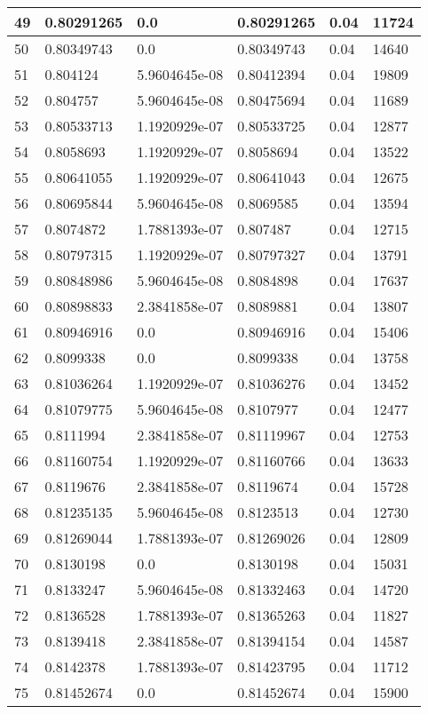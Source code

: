 \begin{longtable}{|l|l|l|l|l|l|}
49 & 0.80291265 & 0.0 & 0.80291265 & 0.04 & 11724 \\ \hline 
50 & 0.80349743 & 0.0 & 0.80349743 & 0.04 & 14640 \\ \hline 
51 & 0.804124 & 5.9604645e-08 & 0.80412394 & 0.04 & 19809 \\ \hline 
52 & 0.804757 & 5.9604645e-08 & 0.80475694 & 0.04 & 11689 \\ \hline 
53 & 0.80533713 & 1.1920929e-07 & 0.80533725 & 0.04 & 12877 \\ \hline 
54 & 0.8058693 & 1.1920929e-07 & 0.8058694 & 0.04 & 13522 \\ \hline 
55 & 0.80641055 & 1.1920929e-07 & 0.80641043 & 0.04 & 12675 \\ \hline 
56 & 0.80695844 & 5.9604645e-08 & 0.8069585 & 0.04 & 13594 \\ \hline 
57 & 0.8074872 & 1.7881393e-07 & 0.807487 & 0.04 & 12715 \\ \hline 
58 & 0.80797315 & 1.1920929e-07 & 0.80797327 & 0.04 & 13791 \\ \hline 
59 & 0.80848986 & 5.9604645e-08 & 0.8084898 & 0.04 & 17637 \\ \hline 
60 & 0.80898833 & 2.3841858e-07 & 0.8089881 & 0.04 & 13807 \\ \hline 
61 & 0.80946916 & 0.0 & 0.80946916 & 0.04 & 15406 \\ \hline 
62 & 0.8099338 & 0.0 & 0.8099338 & 0.04 & 13758 \\ \hline 
63 & 0.81036264 & 1.1920929e-07 & 0.81036276 & 0.04 & 13452 \\ \hline 
64 & 0.81079775 & 5.9604645e-08 & 0.8107977 & 0.04 & 12477 \\ \hline 
65 & 0.8111994 & 2.3841858e-07 & 0.81119967 & 0.04 & 12753 \\ \hline 
66 & 0.81160754 & 1.1920929e-07 & 0.81160766 & 0.04 & 13633 \\ \hline 
67 & 0.8119676 & 2.3841858e-07 & 0.8119674 & 0.04 & 15728 \\ \hline 
68 & 0.81235135 & 5.9604645e-08 & 0.8123513 & 0.04 & 12730 \\ \hline 
69 & 0.81269044 & 1.7881393e-07 & 0.81269026 & 0.04 & 12809 \\ \hline 
70 & 0.8130198 & 0.0 & 0.8130198 & 0.04 & 15031 \\ \hline 
71 & 0.8133247 & 5.9604645e-08 & 0.81332463 & 0.04 & 14720 \\ \hline 
72 & 0.8136528 & 1.7881393e-07 & 0.81365263 & 0.04 & 11827 \\ \hline 
73 & 0.8139418 & 2.3841858e-07 & 0.81394154 & 0.04 & 14587 \\ \hline 
74 & 0.8142378 & 1.7881393e-07 & 0.81423795 & 0.04 & 11712 \\ \hline 
75 & 0.81452674 & 0.0 & 0.81452674 & 0.04 & 15900 \\ \hline 
\end{longtable}